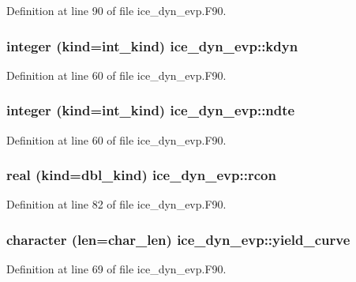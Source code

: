 Definition at line 90 of file ice\_\-dyn\_\-evp.F90.\hypertarget{namespaceice__dyn__evp_a53c5f7c9741c708ff3519f05aed59469}{
\subsubsection[{kdyn}]{\setlength{\rightskip}{0pt plus 5cm}integer (kind=int\_\-kind) {\bf ice\_\-dyn\_\-evp::kdyn}}}
\label{namespaceice__dyn__evp_a53c5f7c9741c708ff3519f05aed59469}


Definition at line 60 of file ice\_\-dyn\_\-evp.F90.\hypertarget{namespaceice__dyn__evp_a8eac575311a1794f1e0157b0f91c48e0}{
\subsubsection[{ndte}]{\setlength{\rightskip}{0pt plus 5cm}integer (kind=int\_\-kind) {\bf ice\_\-dyn\_\-evp::ndte}}}
\label{namespaceice__dyn__evp_a8eac575311a1794f1e0157b0f91c48e0}


Definition at line 60 of file ice\_\-dyn\_\-evp.F90.\hypertarget{namespaceice__dyn__evp_aa1005dc0bcfae1c38b0932bacec32121}{
\subsubsection[{rcon}]{\setlength{\rightskip}{0pt plus 5cm}real (kind=dbl\_\-kind) {\bf ice\_\-dyn\_\-evp::rcon}}}
\label{namespaceice__dyn__evp_aa1005dc0bcfae1c38b0932bacec32121}


Definition at line 82 of file ice\_\-dyn\_\-evp.F90.\hypertarget{namespaceice__dyn__evp_a9dd00f965aaf1ddc6bd6921083e9abb1}{
\subsubsection[{yield\_\-curve}]{\setlength{\rightskip}{0pt plus 5cm}character (len=char\_\-len) {\bf ice\_\-dyn\_\-evp::yield\_\-curve}}}
\label{namespaceice__dyn__evp_a9dd00f965aaf1ddc6bd6921083e9abb1}


Definition at line 69 of file ice\_\-dyn\_\-evp.F90.